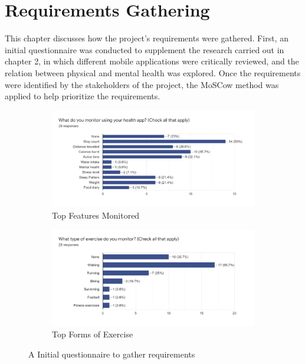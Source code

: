 \documentclass{l4proj}
\begin{document}
\chapter{Requirements Gathering }
This chapter discusses how the project’s requirements were gathered. First, an initial questionnaire was conducted to supplement the research carried out in chapter 2, in which different mobile applications were critically reviewed, and the relation between physical and mental health was explored. Once the requirements were identified by the stakeholders of the project, the MoSCow method was applied to help prioritize the requirements. 

\begin{figure}
\centering
\begin{subfigure}{.50\textwidth}
  \centering
  \includegraphics[width=\linewidth]{dissertation/images/2.png}
  \caption{Top Features Monitored}
  \label{fig:sub1}
\end{subfigure}%
\begin{subfigure}{.5\textwidth}
  \centering
  \includegraphics[width=\linewidth]{dissertation/images/1.png}
  \caption{Top Forms of Exercise}
  \label{fig:sub2}
\end{subfigure}
\caption{A Initial questionnaire to gather requirements}
\label{fig:test}
\end{figure}
\end{document}
